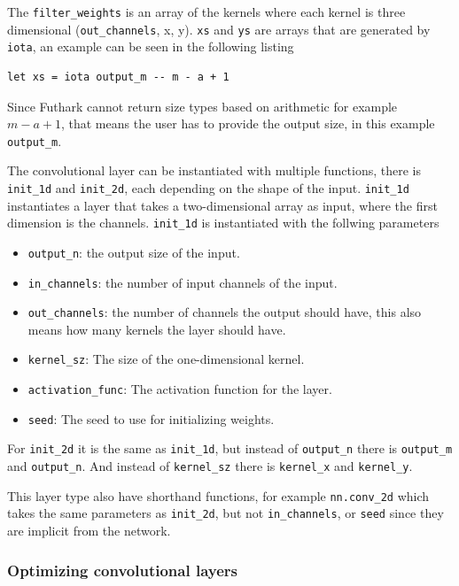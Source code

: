 The \texttt{filter\_weights} is an array of the kernels where each kernel is three dimensional (\texttt{out\_channels}, x, y).
\texttt{xs} and \texttt{ys} are arrays that are generated by \texttt{iota}, an example can be seen in the following listing

\begin{lstlisting}
let xs = iota output_m -- m - a + 1
\end{lstlisting}

Since Futhark cannot return size types based on arithmetic for example $m - a + 1$, that means the user has to provide the output size, in this example \texttt{output\_m}.

The convolutional layer can be instantiated with multiple functions, there is \texttt{init\_1d} and \texttt{init\_2d}, each depending on the shape of the input.
\texttt{init\_1d} instantiates a layer that takes a two-dimensional array as input, where the first dimension is the channels.
\texttt{init\_1d} is instantiated with the follwing parameters
\begin{itemize}
    \item \texttt{output\_n}: the output size of the input.
    \item \texttt{in\_channels}: the number of input channels of the input.
    \item \texttt{out\_channels}: the number of channels the output should have, this also means how many kernels the layer should have.
    \item \texttt{kernel\_sz}: The size of the one-dimensional kernel.
    \item \texttt{activation\_func}: The activation function for the layer.
    \item \texttt{seed}: The seed to use for initializing weights.
\end{itemize}
For \texttt{init\_2d} it is the same as \texttt{init\_1d}, but instead of \texttt{output\_n} there is \texttt{output\_m} and \texttt{output\_n}. And instead of \texttt{kernel\_sz} there is \texttt{kernel\_x} and \texttt{kernel\_y}.

This layer type also have shorthand functions, for example \texttt{nn.conv\_2d} which takes the same parameters as \texttt{init\_2d}, but not \texttt{in\_channels}, or \texttt{seed} since they are implicit from the network.

\subsubsection*{Optimizing convolutional layers}%
\label{ssub:optimize_conv}


